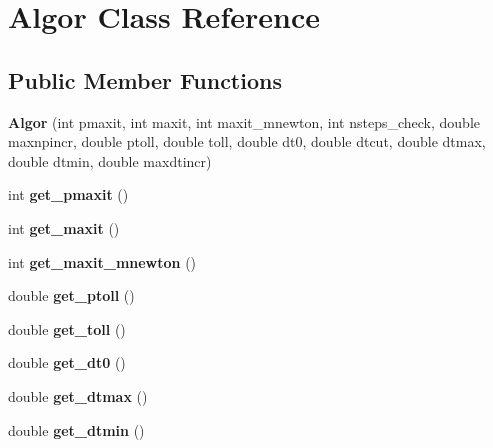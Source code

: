 \hypertarget{classAlgor}{\section{Algor Class Reference}
\label{classAlgor}
}
\subsection*{Public Member Functions}
\begin{DoxyCompactItemize}
\item 
\hypertarget{classAlgor_a7fda0a1b51ae94e73e60485299e56c22}{{\bfseries Algor} (int pmaxit, int maxit, int maxit\-\_\-mnewton, int nsteps\-\_\-check, double maxnpincr, double ptoll, double toll, double dt0, double dtcut, double dtmax, double dtmin, double maxdtincr)}\label{classAlgor_a7fda0a1b51ae94e73e60485299e56c22}

\item 
\hypertarget{classAlgor_aa276e87fa36609fa13920c098147620d}{int {\bfseries get\-\_\-pmaxit} ()}\label{classAlgor_aa276e87fa36609fa13920c098147620d}

\item 
\hypertarget{classAlgor_af07826f4aacd8eb5bf2b244f03afd853}{int {\bfseries get\-\_\-maxit} ()}\label{classAlgor_af07826f4aacd8eb5bf2b244f03afd853}

\item 
\hypertarget{classAlgor_a8f9496740ee4dcd392d8742d320f53e5}{int {\bfseries get\-\_\-maxit\-\_\-mnewton} ()}\label{classAlgor_a8f9496740ee4dcd392d8742d320f53e5}

\item 
\hypertarget{classAlgor_a7a2ac40ee7da75f8e2b1394b811532f6}{double {\bfseries get\-\_\-ptoll} ()}\label{classAlgor_a7a2ac40ee7da75f8e2b1394b811532f6}

\item 
\hypertarget{classAlgor_a6cd572dc026baf42551ee5d05d536f5d}{double {\bfseries get\-\_\-toll} ()}\label{classAlgor_a6cd572dc026baf42551ee5d05d536f5d}

\item 
\hypertarget{classAlgor_aee1d9327b5c0474383fcc9fec70608b9}{double {\bfseries get\-\_\-dt0} ()}\label{classAlgor_aee1d9327b5c0474383fcc9fec70608b9}

\item 
\hypertarget{classAlgor_a26a79ae7fcc910d6c60542e499698869}{double {\bfseries get\-\_\-dtmax} ()}\label{classAlgor_a26a79ae7fcc910d6c60542e499698869}

\item 
\hypertarget{classAlgor_af3873dca57033022eb6e65aade11aadd}{double {\bfseries get\-\_\-dtmin} ()}\label{classAlgor_af3873dca57033022eb6e65aade11aadd}


\end{DoxyCompactItemize}
